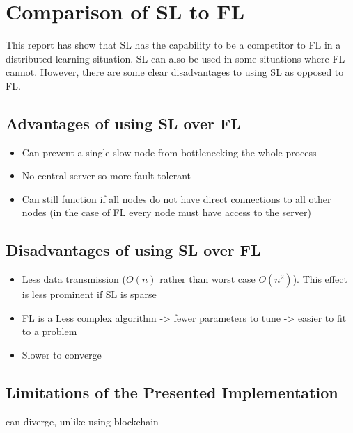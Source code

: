 \section{Comparison of SL to FL}

This report has show that SL has the capability to be a competitor to FL in a distributed learning situation. SL can also be used in some situations where FL cannot. However, there are some clear disadvantages to using SL as opposed to FL.

\subsection{Advantages of using SL over FL}

\begin{itemize}
	\item Can prevent a single slow node from bottlenecking the whole process
	\item No central server so more fault tolerant
	\item Can still function if all nodes do not have direct connections to all other nodes (in the case of FL every node must have access to the server)
\end{itemize}


\subsection{Disadvantages of using SL over FL}
\begin{itemize}
	\item Less data transmission ($O(n)$ rather than worst case $O(n^2)$). This effect is less prominent if SL is sparse
	\item FL is a Less complex algorithm -> fewer parameters to tune -> easier to fit to a problem
	\item Slower to converge
\end{itemize}


\subsection{Limitations of the Presented Implementation}
can diverge, unlike using blockchain